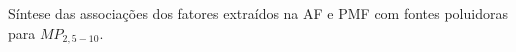 \begin{frame}
	\frametitle{}
	Síntese das associações dos fatores extraídos na AF e PMF com fontes 
	poluidoras para $MP_{2,5-10}$.
	\begin{table}[H]
		\centering
		\tiny
		
	\end{table}
	
	\begin{table}[H]
		\centering
		\tiny
		
	\end{table}
	
\end{frame}






\begin{frame}
  \frametitle{}
\end{frame}


\begin{frame}
  \frametitle{}
\end{frame}



\begin{frame}
  \frametitle{}
\end{frame}



